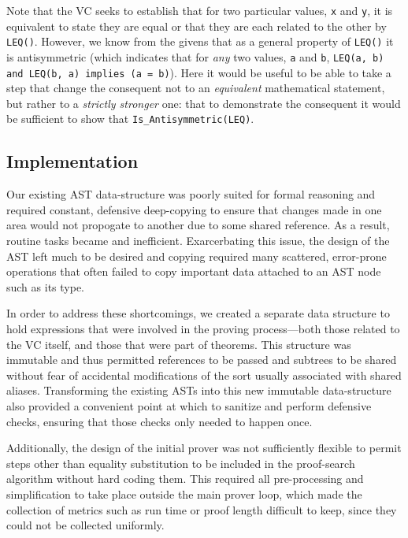 Note that the VC seeks to establish that for two particular values, \texttt{x} and \texttt{y}, it is equivalent to state they are equal or that they are each related to the other by \texttt{LEQ()}.  However, we know from the givens that as a general property of \texttt{LEQ()} it is antisymmetric (which indicates that for \emph{any} two values, \texttt{a} and \texttt{b}, \texttt{LEQ(a,~b) and LEQ(b,~a) implies (a~=~b)}).  Here it would be useful to be able to take a step that change the consequent not to an \emph{equivalent} mathematical statement, but rather to a \emph{strictly stronger} one: that to demonstrate the consequent it would be sufficient to show that \texttt{Is\_Antisymmetric(LEQ)}.

	\subsection{Implementation}	%
Our existing AST data-structure was poorly suited for formal reasoning and required constant, defensive deep-copying to ensure that changes made in one area would not propogate to another due to some shared reference.  As a result, routine tasks became and inefficient.  Exarcerbating this issue, the design of the AST left much to be desired and copying required many scattered, error-prone operations that often failed to copy important data attached to an AST node such as its type.

In order to address these shortcomings, we created a separate data structure to hold expressions that were involved in the proving process---both those related to the VC itself, and those that were part of theorems.  This structure was immutable and thus permitted references to be passed and subtrees to be shared without fear of accidental modifications of the sort usually associated with shared aliases.  Transforming the existing ASTs into this new immutable data-structure also provided a convenient point at which to sanitize and perform defensive checks, ensuring that those checks only needed to happen once.

Additionally, the design of the initial prover was not sufficiently flexible to permit steps other than equality substitution to be included in the proof-search algorithm without hard coding them.  This required all pre-processing and simplification to take place outside the main prover loop, which made the collection of metrics such as run time or proof length difficult to keep, since they could not be collected uniformly.

